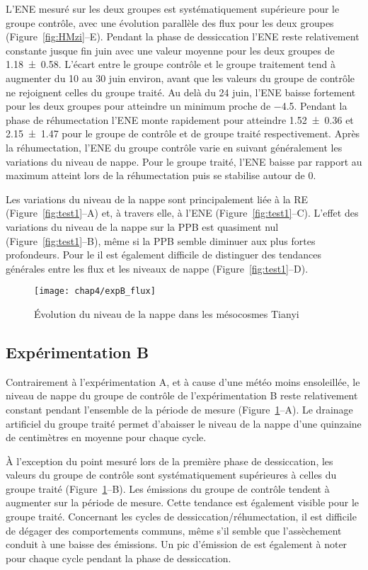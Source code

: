 L'ENE mesuré sur les deux groupes est systématiquement supérieure pour le groupe contrôle, avec une évolution parallèle des flux pour les deux groupes (Figure~\ref{fig:HMzi}--E).
Pendant la phase de dessiccation l'ENE reste relativement constante jusque fin juin avec une valeur moyenne pour les deux groupes de \SI{1.18(058)}{\uml}.
L'écart entre le groupe contrôle et le groupe traitement tend à augmenter du 10 au 30 juin environ, avant que les valeurs du groupe de contrôle ne rejoignent celles du groupe traité.
Au delà du 24 juin, l'ENE baisse fortement pour les deux groupes pour atteindre un minimum proche de \SI{-4.5}{\uml}.
Pendant la phase de réhumectation l'ENE monte rapidement pour atteindre \num{1.52(036)} et \SI{2.15(147)}{\uml} pour le groupe de contrôle et de groupe traité respectivement.
Après la réhumectation, l'ENE du groupe contrôle varie en suivant généralement les variations du niveau de nappe.
Pour le groupe traité, l'ENE baisse par rapport au maximum atteint lors de la réhumectation puis se stabilise autour de 0.

Les variations du niveau de la nappe sont principalement liée à la RE (Figure~\ref{fig:test1}--A) et, à travers elle, à l'ENE (Figure~\ref{fig:test1}--C).
L'effet des variations du niveau de la nappe sur la PPB est quasiment nul (Figure~\ref{fig:test1}--B), même si la PPB semble diminuer aux plus fortes profondeurs.
Pour le \chh il est également difficile de distinguer des tendances générales entre les flux et les niveaux de nappe (Figure~\ref{fig:test1}--D).

\begin{figure}
\centering
\texttt{[image: chap4/expB\_flux]}
\caption{Évolution du niveau de la nappe dans les mésocosmes Tianyi}
\label{fig:HMty}
\end{figure}

\subsection{Expérimentation B}

Contrairement à l'expérimentation A, et à cause d'une météo moins ensoleillée, le niveau de nappe du groupe de contrôle de l'expérimentation B reste relativement constant pendant l'ensemble de la période de mesure (Figure~\ref{fig:HMty}--A).
Le drainage artificiel du groupe traité permet d'abaisser le niveau de la nappe d'une quinzaine de centimètres en moyenne pour chaque cycle.

À l'exception du point mesuré lors de la première phase de dessiccation, les valeurs du groupe de contrôle sont systématiquement supérieures à celles du groupe traité (Figure~\ref{fig:HMty}--B).
Les émissions du groupe de contrôle tendent à augmenter sur la période de mesure.
Cette tendance est également visible pour le groupe traité.
Concernant les cycles de dessiccation/réhumectation, il est difficile de dégager des comportements communs, même s'il semble que l'assèchement conduit à une baisse des émissions.
Un pic d'émission de \chh est également à noter pour chaque cycle pendant la phase de dessiccation.

